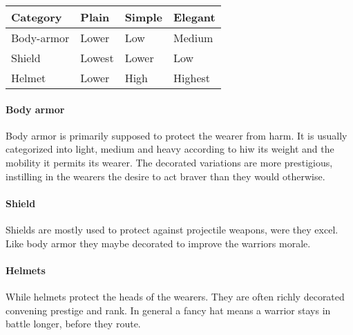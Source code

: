 \begin{longtable}{llll}
	\toprule
	Category   & Plain  & Simple & Elegant \\
	\midrule
	Body-armor & Lower  & Low    & Medium  \\
	Shield     & Lowest & Lower  & Low     \\
	Helmet     & Lower  & High   & Highest \\
	\bottomrule
\end{longtable}

\paragraph{Body armor}

Body armor is primarily supposed to protect the wearer from harm. It is usually
categorized into light, medium and heavy according to hiw its weight and the
mobility it permits its wearer. The decorated variations are more prestigious,
instilling in the wearers the desire to act braver than they would otherwise.

\paragraph{Shield}

Shields are mostly used to protect against projectile weapons, were they excel.
Like body armor they maybe decorated to improve the warriors morale.

\paragraph{Helmets}

While helmets protect the heads of the wearers. They are often richly decorated
convening prestige and rank. In general a fancy hat means a warrior stays in
battle longer, before they route.

